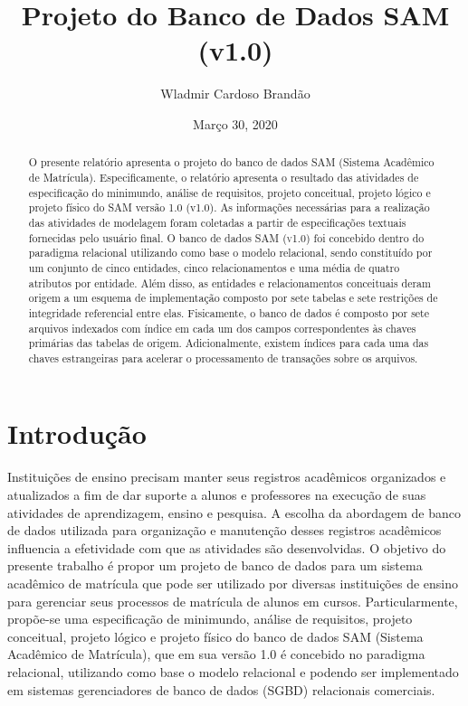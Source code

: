 \documentclass{article}
\title{Projeto do Banco de Dados SAM (v1.0)}
\author{Wladmir Cardoso Brand\~ao}
\date{Mar\c{c}o 30, 2020}
\begin{document}
\maketitle

\begin{abstract}

O presente relat\'orio apresenta o projeto do banco de dados SAM (Sistema Acad\^emico de Matrícula). Especificamente, o relat\'orio apresenta o resultado das atividades de especifica\c{c}\~ao do minimundo, an\'alise de requisitos, projeto conceitual, projeto l\'ogico e projeto f\'isico do SAM vers\~ao 1.0 (v1.0). As informa\c{c}\~oes necess\'arias para a realiza\c{c}\~ao das atividades de modelagem foram coletadas a partir de especifica\c{c}\~oes textuais fornecidas pelo usu\'ario final. O banco de dados \textsc{SAM (v1.0)} foi concebido dentro do paradigma relacional utilizando como base o modelo relacional, sendo constitu\'ido por um conjunto de cinco entidades, cinco relacionamentos e uma m\'edia de quatro atributos por entidade. Al\'em disso, as entidades e relacionamentos conceituais deram origem a um esquema de implementa\c{c}\~ao composto por sete tabelas e sete restri\c{c}\~oes de integridade referencial entre elas. Fisicamente, o banco de dados \'e composto por sete arquivos indexados com \'indice em cada um dos campos correspondentes \`as chaves prim\'arias das tabelas de origem. Adicionalmente, existem \'indices para cada uma das chaves estrangeiras para acelerar o processamento de transa\c{c}\~oes sobre os arquivos.

\end{abstract}

\section{Introdu\c{c}\~ao}
\label{sec:intro}
Institui\c{c}\~oes de ensino precisam manter seus registros acad\^emicos organizados e atualizados a fim de dar suporte a alunos e professores na execu\c{c}\~ao de suas atividades de aprendizagem, ensino e pesquisa.
A escolha da abordagem de banco de dados utilizada para organiza\c{c}\~ao e manuten\c{c}\~ao desses registros acad\^emicos influencia a efetividade com que as atividades s\~ao desenvolvidas.
O objetivo do presente trabalho \'e propor um projeto de banco de dados para um sistema acad\^emico de matr\'icula que pode ser utilizado por diversas institui\c{c}\~oes de ensino para gerenciar seus processos de matr\'icula de alunos em cursos.
Particularmente, prop\~oe-se uma especifica\c{c}\~ao de minimundo, an\'alise de requisitos, projeto conceitual, projeto l\'ogico e projeto f\'isico do banco de dados SAM (Sistema Acad\^emico de Matrícula), que em sua vers\~ao 1.0 \'e concebido no paradigma relacional, utilizando como base o modelo relacional e podendo ser implementado em sistemas gerenciadores de banco de dados (SGBD) relacionais comerciais.
\end{document}
